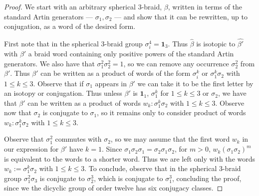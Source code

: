 \documentclass[10pt,a4paper]{amsart}
\begin{document}
\begin{proof}
    We start with an arbitrary spherical $3$-braid, $\beta$, written in terms of the standard Artin generators --- $\sigma_1,\sigma_2$ --- and show that it can be rewritten, up to conjugation, as a word of the desired form.
    
    First note that in the spherical $3$-braid group $\sigma_i^4=\mathbf{1}_3$. Thus $\widehat{\beta}$ is isotopic to $\widehat{\beta'}$ with $\beta'$ a braid word containing only positive powers of the standard Artin generators. We also have that $\sigma_1^2\sigma_2^2=1$, so we can remove any occurrence $\sigma_2^2$ from $\beta'$. Thus $\beta'$ can be written as a product of words of the form $\sigma_i^k$ or $\sigma_1^k\sigma_2$ with $1\leq k\leq 3$. Observe that if $\sigma_1$ appears in $\beta'$ we can take it to be the first letter by an isotopy or conjugation. Thus unless $\beta'$ is $\mathbf{1}_1$, $\sigma_1^k$ for $1\leq k\leq 3$ or $\sigma_2$, we have that $\beta'$ can be written as a product of words $w_k:\sigma_1^k\sigma_2$ with $1\leq k\leq 3$. Observe now that $\sigma_2$ is conjugate to $\sigma_1$, so it remains only to consider product of words $w_k:\sigma_1^k\sigma_2$ with $1\leq k\leq 3$.

Observe that $\sigma_1^2$ commutes with $\sigma_2$, so we may assume that the first word $w_k$ in our expression for $\beta'$ have $k=1$. Since $\sigma_1\sigma_2\sigma_1=\sigma_2\sigma_1\sigma_2$, for $m>0$, $w_k(\sigma_1\sigma_2)^m$ is equivalent to the words to a shorter word. Thus we are left only with the words $w_k:=\sigma_1^k\sigma_2$ with $1\leq k\leq 3$. To conclude, observe that in the spherical $3$-braid group $\sigma_1^2\sigma_3$ is conjugate to $\sigma_2^3$, which is conjugate to $\sigma_1^3$, concluding the proof, since we the dicyclic group of order twelve has six conjugacy classes.\end{proof}
\end{document}
